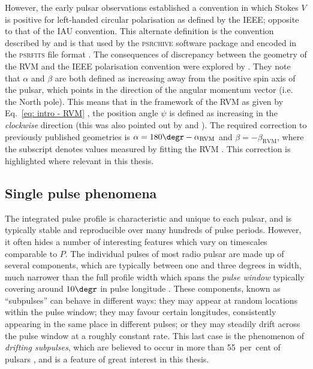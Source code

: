 However, the early pulsar observations \citep[e.g.][]{Mxxx1971} established a convention in which Stokes $V$ is positive for left-handed circular polarisation as defined by the IEEE; opposite to that of the IAU convention. This alternate definition is the convention described by \citet{Kxxx1966} and is that used by the \textsc{psrchive} software package and encoded in the \textsc{psrfits} file format \citep{SMJR2010}. The consequences of discrepancy between the geometry of the RVM and the IEEE polarisation convention were explored by \citet{EWxx2001}. They note that $\alpha$ and $\beta$ are both defined as increasing away from the positive spin axis of the pulsar, which points in the direction of the angular momentum vector (i.e. the North pole). This means that in the framework of the RVM as given by Eq.~\eqref{eq: intro - RVM} \citep{Kxxx1970}, the position angle $\psi$ is defined as increasing in the \textit{clockwise} direction (this was also pointed out by \citealt{DTxx1992} and \citealt{APTW1996}). The required correction to previously published geometries is $\alpha = 180\degr - \alpha_\mathrm{RVM}$ and $\beta = -\beta_\mathrm{RVM}$, where the subscript denotes values measured by fitting the RVM \citep{EWxx2001}. This correction is highlighted where relevant in this thesis. 


\subsection{Single pulse phenomena}
\label{sec: intro - emission models - single pulse phenomena}

The integrated pulse profile is characteristic and unique to each pulsar, and is typically stable and reproducible over many hundreds of pulse periods. However, it often hides a number of interesting features which vary on timescales comparable to $P$. The individual pulses of most radio pulsar are made up of several components, which are typically between one and three degrees in width, much narrower than the full profile width which spans the \textit{pulse window} typically covering around $10\degr$ in pulse longitude \citep[e.g.][]{KWJ+1994}. These components, known as ``subpulses'' can behave in different ways: they may appear at random locations within the pulse window; they may favour certain longitudes, consistently appearing in the same place in different pulses; or they may steadily drift across the pulse window at a roughly constant rate. This last case is the phenomenon of \textit{drifting subpulses}, which are believed to occur in more than 55~per~cent of pulsars \citep{WESx2007}, and is a feature of great interest in this thesis.

